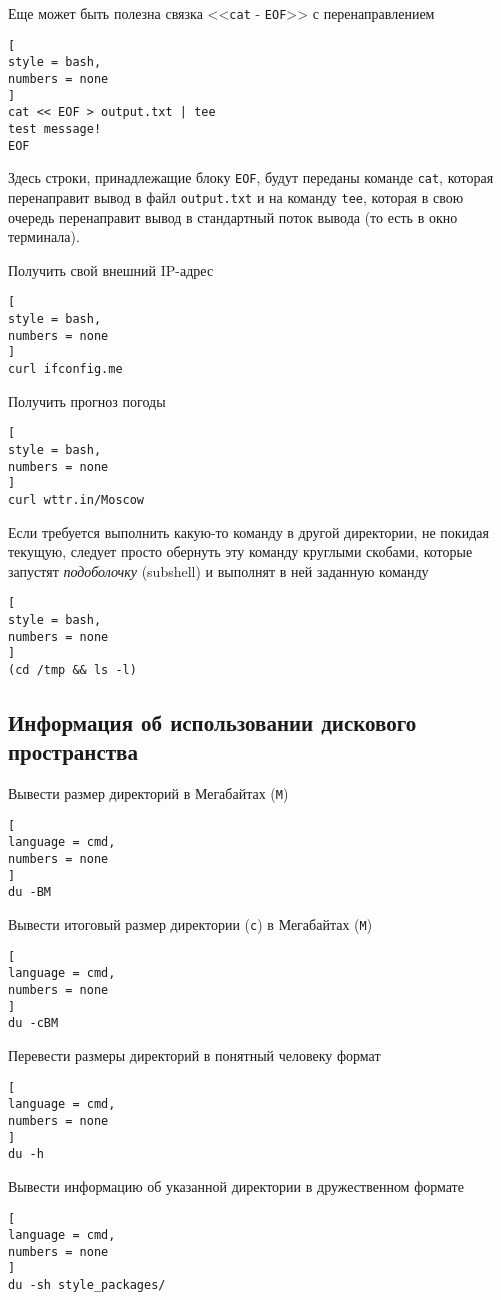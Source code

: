 \documentclass[%
	11pt,
	a4paper,
	utf8,
		]{article}
\begin{document}
Еще может быть полезна связка <<\texttt{cat} - \texttt{EOF}>> с перенаправлением
\begin{lstlisting}[
style = bash,
numbers = none	
]
cat << EOF > output.txt | tee
test message!
EOF
\end{lstlisting}
Здесь строки, принадлежащие блоку \texttt{EOF}, будут переданы команде \texttt{cat}, которая перенаправит вывод в файл \texttt{output.txt} и на команду \texttt{tee}, которая в свою очередь перенаправит вывод в стандартный поток вывода (то есть в окно терминала).

Получить свой внешний IP-адрес
\begin{lstlisting}[
style = bash,
numbers = none	
]
curl ifconfig.me
\end{lstlisting}

Получить прогноз погоды
\begin{lstlisting}[
style = bash,
numbers = none	
]
curl wttr.in/Moscow
\end{lstlisting}

Если требуется выполнить какую-то команду в другой директории, не покидая текущую, следует просто обернуть эту команду круглыми скобами, которые запустят \emph{подоболочку} (subshell) и выполнят в ней заданную команду
\begin{lstlisting}[
style = bash,
numbers = none	
]
(cd /tmp && ls -l)
\end{lstlisting}


\subsection{Информация об использовании дискового пространства}

Вывести размер директорий в Мегабайтах (\texttt{M})
\begin{lstlisting}[
language = cmd,
numbers = none
]
du -BM
\end{lstlisting}

Вывести итоговый размер директории (\texttt{c}) в Мегабайтах (\texttt{M})
\begin{lstlisting}[
language = cmd,
numbers = none
]
du -cBM
\end{lstlisting}

Перевести размеры директорий в понятный человеку формат
\begin{lstlisting}[
language = cmd,
numbers = none
]
du -h
\end{lstlisting}

Вывести информацию об указанной директории в дружественном формате
\begin{lstlisting}[
language = cmd,
numbers = none
]
du -sh style_packages/
\end{lstlisting}
\end{document}
